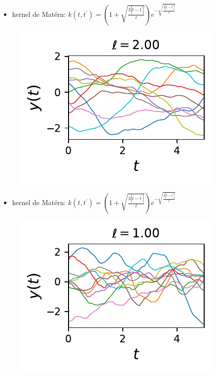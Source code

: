 \documentclass[xcolor=svgnames, t]{beamer}
\begin{document}
\begin{frame}{\subsecname}
  
  \begin{itemize}
    \item kernel de Matérn:
    $k (t, t^\prime) = ( 1 + \sqrt{\frac{3 |t - t^\prime|}{\ell} } ) e^{-\sqrt{\frac{3 |t - t^\prime|}{\ell} }}$
  \end{itemize}
  \begin{figure}
    \includegraphics{10_gp_time_MaternKernel_2.00.pdf}
  \end{figure}
\end{frame}

\begin{frame}{\subsecname}
  
  \begin{itemize}
    \item kernel de Matérn:
    $k (t, t^\prime) = ( 1 + \sqrt{\frac{3 |t - t^\prime|}{\ell} } ) e^{-\sqrt{\frac{3 |t - t^\prime|}{\ell} }}$
  \end{itemize}
  \begin{figure}
    \includegraphics{10_gp_time_MaternKernel_1.00.pdf}
  \end{figure}
\end{frame}
\end{document}
